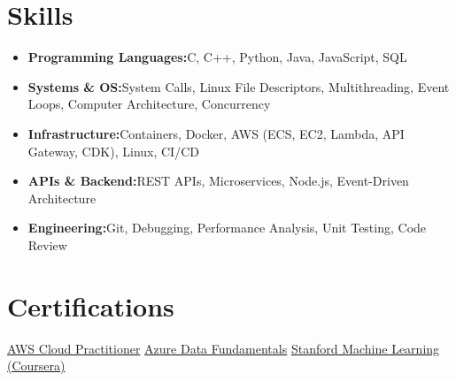 \documentclass[a4paper,10pt]{article}
\newcommand{\resumeItem}[2]{\item{\textbf{#1}{\hspace{0.5mm}#2 \vspace{-0.5mm}}}}
\newcommand{\resumeSubItem}[2]{\resumeItem{#1}{#2}\vspace{-3pt}}
\newcommand{\resumeHeadingSkillStart}{\begin{itemize}[leftmargin=*, itemsep=0.6mm, rightmargin=2ex]}
\newcommand{\resumeHeadingSkillEnd}{\end{itemize}\vspace{-2mm}}
\begin{document}
\section{\textbf{Skills}}
\resumeHeadingSkillStart
\resumeSubItem{Programming Languages:}{C, C++, Python, Java, JavaScript, SQL}
\resumeSubItem{Systems \& OS:}{System Calls, Linux File Descriptors, Multithreading, Event Loops, Computer Architecture, Concurrency}
\resumeSubItem{Infrastructure:}{Containers, Docker, AWS (ECS, EC2, Lambda, API Gateway, CDK), Linux, CI/CD}
\resumeSubItem{APIs \& Backend:}{REST APIs, Microservices, Node.js, Event-Driven Architecture}
\resumeSubItem{Engineering:}{Git, Debugging, Performance Analysis, Unit Testing, Code Review}
\resumeHeadingSkillEnd
\vspace{0mm}

\section{\textbf{Certifications}}
\footnotesize{
\href{https://drive.google.com/file/d/1a3exoiS79RS3q8vSJHT-PpkczSPg54EZ/view}{AWS Cloud Practitioner} \hfill \href{https://drive.google.com/file/d/1VBJjfRMsIm8BckoUtLUV7ZbY88Jju2qT/view}{Azure Data Fundamentals} \hfill \href{https://drive.google.com/file/d/1At3BLkqJ9vuhPPUCcrNAw9yNH5li7XdQ/view}{Stanford Machine Learning (Coursera)}
}
\end{document}
